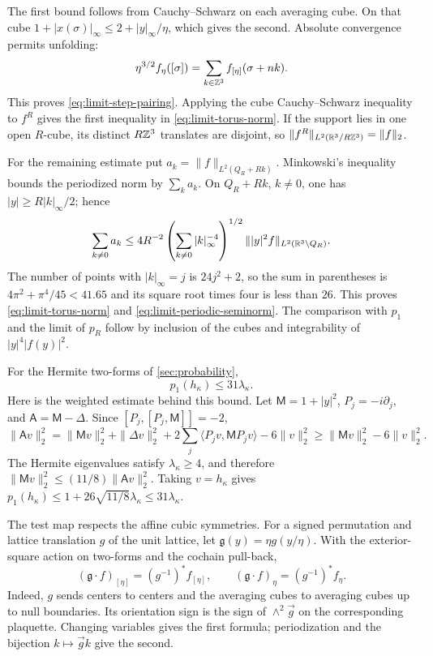 The first bound follows from Cauchy--Schwarz on each averaging
cube. On that cube $1+|x(\sigma)|_\infty\le2+|y|_\infty/\eta$,
which gives the second. Absolute convergence permits unfolding:
\[
 \eta^{3/2}f_\eta([\sigma])
       =\sum_{k\in\mathbb Z^3}f_{[\eta]}(\sigma+nk).
\]
This proves \eqref{eq:limit-step-pairing}. Applying the cube
Cauchy--Schwarz inequality to $f^R$ gives the first inequality in
\eqref{eq:limit-torus-norm}. If the support lies in one open
$R$-cube, its distinct $R\mathbb Z^3$ translates are disjoint, so
$\|f^R\|_{L^2(\mathbb R^3/R\mathbb Z^3)}=\|f\|_2$.

For the remaining estimate put $a_k=\|f\|_{L^2(Q_R+Rk)}$.
Minkowski's inequality bounds the periodized norm by $\sum_k a_k$.
On $Q_R+Rk$, $k\ne0$, one has $|y|\ge R|k|_\infty/2$; hence
\[
 \sum_{k\ne0}a_k
 \le4R^{-2}\left(\sum_{k\ne0}|k|_\infty^{-4}\right)^{1/2}
                   \||y|^2f\|_{L^2(\mathbb R^3\setminus Q_R)}.
\]
The number of points with $|k|_\infty=j$ is $24j^2+2$, so
the sum in parentheses is $4\pi^2+\pi^4/45<41.65$ and its
square root times four is less than $26$.
This proves \eqref{eq:limit-torus-norm} and
\eqref{eq:limit-periodic-seminorm}. The comparison with $p_1$
and the limit of $p_R$ follow by inclusion of the cubes and
integrability of $|y|^4|f(y)|^2$.

For the Hermite two-forms of \cref{sec:probability},
\begin{equation}\label{eq:limit-Hermite-norm}
 p_1(h_\kappa)\le31\lambda_\kappa.
\end{equation}
Here is the weighted estimate behind this bound. Let
$\mathsf M=1+|y|^2$, $P_j=-i\partial_j$, and
$\mathsf A=\mathsf M-\Delta$. Since
$[P_j,[P_j,\mathsf M]]=-2$,
\[
 \|\mathsf A v\|_2^2
 =\|\mathsf Mv\|_2^2+\|\Delta v\|_2^2
      +2\sum_j\langle P_jv,\mathsf MP_jv\rangle-6\|v\|_2^2
 \ge\|\mathsf Mv\|_2^2-6\|v\|_2^2.
\]
The Hermite eigenvalues satisfy $\lambda_\kappa\ge4$, and therefore
$\|\mathsf Mv\|_2^2\le(11/8)\|\mathsf Av\|_2^2$.
Taking $v=h_\kappa$ gives
$p_1(h_\kappa)\le1+26\sqrt{11/8}\lambda_\kappa
\le31\lambda_\kappa$.

The test map respects the affine cubic symmetries. For a signed
permutation and lattice translation $g$ of the unit lattice, let
$\mathfrak g(y)=\eta g(y/\eta)$. With the exterior-square action
on two-forms and the cochain pull-back,
\begin{equation}\label{eq:limit-test-equivariance}
 (\mathfrak g\cdot f)_{[\eta]}=(g^{-1})^*f_{[\eta]},
 \qquad
 (\mathfrak g\cdot f)_\eta=(g^{-1})^*f_\eta.
\end{equation}
Indeed, $g$ sends centers to centers and the averaging cubes to
averaging cubes up to null boundaries. Its orientation sign is
the sign of $\wedge^2\vec g$ on the corresponding plaquette.
Changing variables gives the first formula; periodization and
the bijection $k\mapsto\vec gk$ give the second.

